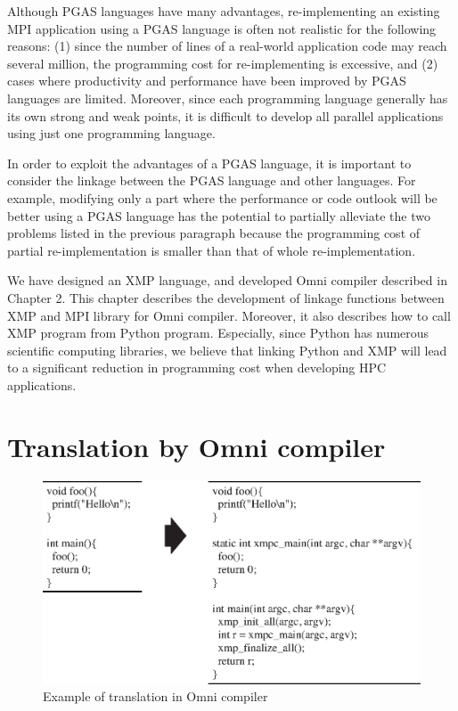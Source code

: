 \documentclass[graybox]{svmult}
\begin{document}
Although PGAS languages have many advantages,
re-implementing an existing MPI application using a PGAS language is often not realistic for the following reasons:
(1) since the number of lines of a real-world application code may reach several million, the programming cost for re-implementing is excessive, and
(2) cases where productivity and performance have been improved by PGAS languages are limited.
Moreover, since each programming language generally has its own strong and weak points, it is difficult to develop all parallel applications using just one programming language.

In order to exploit the advantages of a PGAS language,
it is important to consider the linkage between the PGAS language and other languages.
For example,
modifying only a part where the performance or code outlook will be better using a PGAS language
has the potential to partially alleviate the two problems listed in the previous paragraph because the programming cost of partial re-implementation is smaller than that of whole re-implementation.

We have designed an XMP language, and developed Omni compiler described in Chapter 2.
This chapter describes the development of linkage functions between XMP and MPI library for Omni compiler.
Moreover, it also describes how to call XMP program from Python program.
Especially,
since Python has numerous scientific computing libraries,
we believe that linking Python and XMP will lead to a significant reduction in programming cost when developing HPC applications.
\section{Translation by Omni compiler}\label{sec:translation}

\begin{figure}[h]
\sidecaption
\includegraphics[scale=.82]{img/translation.eps}
\caption{Example of translation in Omni compiler\cite{pgas-ei}} \label{fig:translation}
\end{figure}
\end{document}

